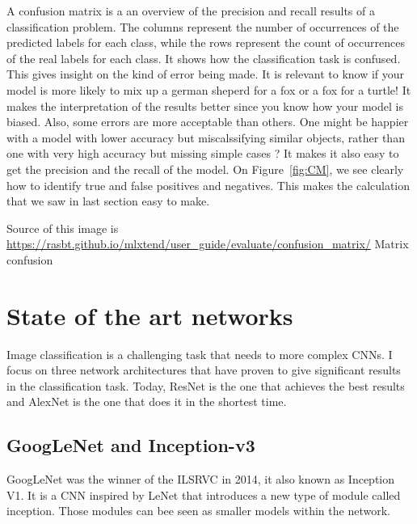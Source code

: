 A confusion matrix is a an overview of the precision and recall results of a classification problem. The columns represent the number of occurrences of the predicted labels for each class, while the rows represent the count of occurrences of the real labels for each class. It shows how the classification task is confused. This gives insight on the kind of error being made. It is relevant to know if your model is more likely to mix up  a german sheperd for a fox or a fox for a turtle! It makes the interpretation of the results better since you know how your model is biased. Also, some errors are more acceptable than others. One might be happier with a model with lower accuracy but miscalssifying similar objects, rather than one with very high accuracy but missing simple cases ?
It makes it also easy to get the precision and the recall of the model. On Figure~\ref{fig:CM}, we see clearly how to identify true and false positives and negatives. This makes the calculation that we saw in last section easy to make. 

Source of this image is \url{https://rasbt.github.io/mlxtend/user_guide/evaluate/confusion_matrix/} Matrix confusion



\section{State of the art networks}
Image classification is a challenging task that needs to more complex CNNs. I focus on three network architectures that have proven to give significant results in the classification task. Today, ResNet is the one that achieves the best results and AlexNet is the one that does it in the shortest time.    
\subsection{GoogLeNet and Inception-v3}
GoogLeNet was the winner of the ILSRVC in 2014, it also known as Inception V1. It is a CNN inspired by LeNet that introduces a new type of module called inception. Those modules can bee seen as smaller models within the network. 

